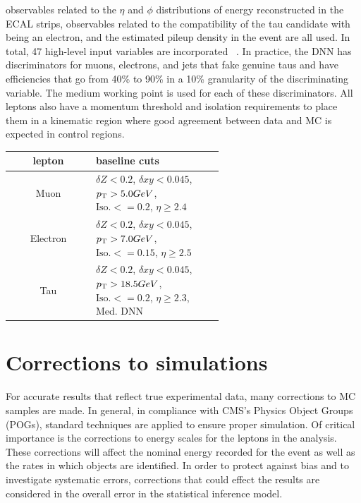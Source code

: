 observables related to the $\eta$ and $\phi$ distributions of energy reconstructed in the ECAL strips,
observables related to the compatibility of the tau candidate with being an electron, 
and the estimated pileup density in the event are all used. In total, 47 high-level input variables are incorporated 
~\cite{https://doi.org/10.48550/arxiv.2201.08458}.
In practice, the DNN has discriminators for muons, electrons, and jets that fake genuine taus and have efficiencies that go from 40\% to 90\% in a 10\% granularity of the discriminating variable. The medium working point is used for each of these discriminators. 
All leptons also have a momentum threshold and isolation requirements to place them in a kinematic region where good agreement between data and MC is expected in control regions.  

\begin{table}[h!tbp]
\centering
{}
\begin{tabular*}{0.8\textwidth}{c|p{0.6\linewidth}}
\hline
lepton          & baseline cuts \\\hline 
Muon            & $\delta Z < 0.2$, $\delta xy < 0.045$, $p_{\mathrm{T}} > 5.0 GeV$, $\text{Iso.} <= 0.2$, $\eta \geq 2.4$\\\hline
Electron        & $\delta Z < 0.2$, $\delta xy < 0.045$, $p_{\mathrm{T}} > 7.0 GeV$, $\text{Iso.} <= 0.15$, $\eta \geq 2.5$ \\\hline
Tau             & $\delta Z < 0.2$, $\delta xy < 0.045$, $p_{\mathrm{T}} > 18.5 GeV$, $\text{Iso.} <= 0.2$, $\eta \geq 2.3$, Med. DNN \\\hline
\end{tabular*}
\end{table}


\section{Corrections to simulations }
\label{sec:corrections}

For accurate results that reflect true experimental data, many corrections to MC samples are made. In general, in compliance with CMS's Physics Object Groups (POGs), standard techniques are applied to ensure proper simulation. Of critical importance is the corrections to energy scales for the leptons in the analysis. These corrections will affect the nominal energy recorded for the event as well as the rates in which objects are identified.  In order to protect against bias and to investigate systematic errors, corrections that could effect the results are considered in the overall error in the statistical inference model.

